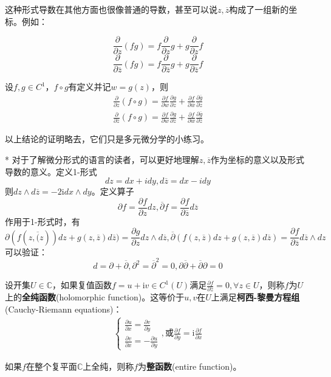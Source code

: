\documentclass{ctexbook}
\begin{document}
这种形式导数在其他方面也很像普通的导数，甚至可以说$z,\overline{z}$构成了一组新的坐标。例如：
\begin{theorem}[莱布尼兹法则]
    \[\frac{\partial}{\partial z}(fg)=f\frac{\partial}{\partial z}g+g\frac{\partial}{\partial z}f\]
    \[\frac{\partial}{\partial \overline{z}}(fg)=f\frac{\partial}{\partial \overline{z}}g+g\frac{\partial}{\partial \overline{z}}f\]
\end{theorem}
\begin{theorem}[链式法则]
    设$f,g\in C^1$，$f\circ g$有定义并记$w=g(z)$，则
    \begin{align*}
        \frac{\partial}{\partial z}(f\circ g)=\frac{\partial f}{\partial w}\frac{\partial g}{\partial z}+\frac{\partial f}{\partial \overline{w}}\frac{\partial\overline{g}}{\partial z}\\
        \frac{\partial}{\partial \overline{z}}(f\circ g)=\frac{\partial f}{\partial w}\frac{\partial g}{\partial \overline{z}}+\frac{\partial f}{\partial \overline{w}}\frac{\partial\overline{g}}{\partial \overline{z}}
    \end{align*}
\end{theorem}
以上结论的证明略去，它们只是多元微分学的小练习。
\begin{remark}*
    对于了解微分形式的语言的读者，可以更好地理解$z,\overline{z}$作为坐标的意义以及形式导数的意义。定义1-形式\cite{shijihuai}
    $$dz=dx+idy,d\overline{z}=dx-idy$$
    则$dz\wedge d\overline{z}=-2\mathrm{i} dx\wedge dy$。定义算子
    $$\partial f=\frac{\partial f}{\partial z}dz,\overline{\partial} f=\frac{\partial f}{\partial \overline{z}}d\overline{z}$$
    作用于1-形式时，有
    $$\partial(f(z,\overline(z))dz+g(z,\overline{z})d\overline{z})=\frac{\partial g}{\partial z}dz\wedge d\overline{z},\overline{\partial}(f(z,\overline{z})dz+g(z,\overline{z})d\overline{z})=\frac{\partial f}{\partial \overline{z}}d\overline{z}\wedge dz$$
    可以验证：$$d=\partial+\overline{\partial},\partial^2=\overline{\partial}^2=0,\partial\overline{\partial}+\overline{\partial}\partial=0$$
\end{remark}
\begin{definition}[全纯函数]
    设开集$U\in\mathbb{C}$，如果复值函数$f=u+\mathrm{i}v\in C^1(U)$满足$\frac{\partial f}{\partial \overline{z}}=0,\forall z\in U$，则称$f$为$U$上的\textbf{全纯函数}(holomorphic function)。这等价于$u,v$在$U$上满足\textbf{柯西-黎曼方程组}(Cauchy-Riemann equations)：
    \begin{align*}
        \begin{cases}
        \frac{\partial u}{\partial x}=\frac{\partial v}{\partial y}\\
        \frac{\partial v}{\partial x}=-\frac{\partial u}{\partial y}
        \end{cases},\text{或}\frac{\partial f}{\partial y}= \mathrm{i}\frac{\partial f}{\partial x}
    \end{align*}
\end{definition}
\begin{definition}[整函数]
    如果$f$在整个复平面$\mathbb{C}$上全纯，则称$f$为\textbf{整函数}(entire function)。
\end{definition}
\end{document}
